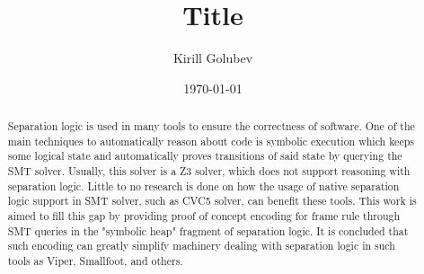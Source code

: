 \documentclass[a4paper]{article}
\title{Title}
\author{Kirill Golubev}
\date{\today}
\begin{document}
\begin{abstract}
Separation logic is used in many tools to ensure the correctness of software. One of the main techniques to automatically reason about code is symbolic execution which keeps some logical state and automatically proves transitions of said state by querying the SMT solver. Usually, this solver is a Z3 solver, which does not support reasoning with separation logic. Little to no research is done on how the usage of native separation logic support in SMT solver, such as CVC5 solver, can benefit these tools. This work is aimed to fill this gap by providing proof of concept encoding for frame rule through SMT queries in the "symbolic heap" fragment of separation logic. It is concluded that such encoding can greatly simplify machinery dealing with separation logic in such tools as Viper, Smallfoot, and others.
\end{abstract}

    \maketitle

    \tableofcontents

    


    


    \printbibliography
\end{document}
